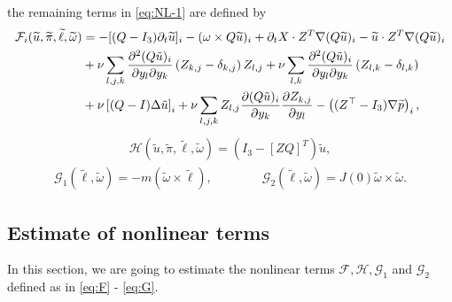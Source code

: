 \documentclass[12pt,a4paper,reqno]{amsart}
\theoremstyle{definition}
\theoremstyle{remark}
\numberwithin{equation}{section}
\begin{document}
the remaining terms in \eqref{eq:NL-1} are defined by
\begin{align} \label{eq:F}
\mathcal{F}_{i}(\widetilde u, \widetilde \pi, \widetilde \ell, \widetilde \omega) & = - [(Q-I_{3}) \partial_{t} \widetilde u]_{i} - (\omega \times Q\widetilde u)_{i}  + \partial_{t} X  \cdot Z^{T} \nabla (Q\widetilde u)_{i} - \widetilde u  \cdot Z^{T} \nabla (Q\widetilde u)_{i} \\
& + \nu\sum_{l,j,k} \frac{\partial^2 (Q\tilde u)_{i} }{\partial y_l\partial y_k}  \left(Z_{k,j}  - \delta_{k,j}\right) Z_{l,j}  + \nu\sum_{l,k} \frac{\partial^2 (Q\tilde u)_{i} }{\partial y_l\partial y_k} \left( Z_{l,k} - \delta_{l,k} \right)
\notag \\
& + \nu \left[ (Q - I) \Delta \tilde u\right]_{i} + \nu \sum_{l,j,k} Z_{l,j} \frac{\partial  (Q \tilde u)_i}{\partial y_k} \frac{\partial Z_{k,j}}{\partial y_{l}} - \left( (Z^{\top} - I_{3}) \nabla\widetilde p\right)_{i}, \notag
\end{align}
\begin{align} \label{eq:H}
\mathcal{H}(\widetilde u, \widetilde \pi, \widetilde \ell, \widetilde \omega) = (I_{3} - [ZQ]^{T}) \widetilde u,
\end{align}
\begin{align} \label{eq:G}
\mathcal{G}_{1}( \widetilde \ell, \widetilde \omega) = - m (\widetilde \omega \times \widetilde \ell), \qquad \qquad \mathcal{G}_{2}( \widetilde \ell, \widetilde \omega) = J(0) \widetilde \omega \times \widetilde \omega.
\end{align}



\subsection{Estimate of nonlinear terms}
In this section, we are going to estimate the nonlinear terms $\mathcal{F},\mathcal{H},\mathcal{G}_{1}$ and $\mathcal{G}_{2}$ defined as in \eqref{eq:F} - \eqref{eq:G}.

\medskip
\end{document}
